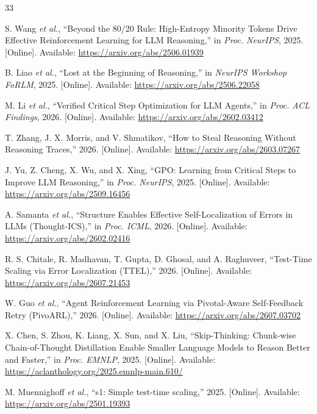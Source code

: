 \documentclass[conference]{IEEEtran}
\begin{document}
\begin{thebibliography}{33}

S. Wang \emph{et al.}, ``Beyond the 80/20 Rule: High-Entropy Minority Tokens Drive Effective Reinforcement Learning for LLM Reasoning,'' in \emph{Proc. NeurIPS}, 2025. [Online]. Available: \url{https://arxiv.org/abs/2506.01939}

B. Liao \emph{et al.}, ``Lost at the Beginning of Reasoning,'' in \emph{NeurIPS Workshop FoRLM}, 2025. [Online]. Available: \url{https://arxiv.org/abs/2506.22058}

M. Li \emph{et al.}, ``Verified Critical Step Optimization for LLM Agents,'' in \emph{Proc. ACL Findings}, 2026. [Online]. Available: \url{https://arxiv.org/abs/2602.03412}

T. Zhang, J. X. Morris, and V. Shmatikov, ``How to Steal Reasoning Without Reasoning Traces,'' 2026. [Online]. Available: \url{https://arxiv.org/abs/2603.07267}

J. Yu, Z. Cheng, X. Wu, and X. Xing, ``GPO: Learning from Critical Steps to Improve LLM Reasoning,'' in \emph{Proc. NeurIPS}, 2025. [Online]. Available: \url{https://arxiv.org/abs/2509.16456}

A. Samanta \emph{et al.}, ``Structure Enables Effective Self-Localization of Errors in LLMs (Thought-ICS),'' in \emph{Proc. ICML}, 2026. [Online]. Available: \url{https://arxiv.org/abs/2602.02416}

R. S. Chitale, R. Madhavan, T. Gupta, D. Ghosal, and A. Raghuveer, ``Test-Time Scaling via Error Localization (TTEL),'' 2026. [Online]. Available: \url{https://arxiv.org/abs/2607.21453}

W. Guo \emph{et al.}, ``Agent Reinforcement Learning via Pivotal-Aware Self-Feedback Retry (PivoARL),'' 2026. [Online]. Available: \url{https://arxiv.org/abs/2607.03702}

X. Chen, S. Zhou, K. Liang, X. Sun, and X. Liu, ``Skip-Thinking: Chunk-wise Chain-of-Thought Distillation Enable Smaller Language Models to Reason Better and Faster,'' in \emph{Proc. EMNLP}, 2025. [Online]. Available: \url{https://aclanthology.org/2025.emnlp-main.610/}

M. Muennighoff \emph{et al.}, ``s1: Simple test-time scaling,'' 2025. [Online]. Available: \url{https://arxiv.org/abs/2501.19393}


\end{thebibliography}
\end{document}
